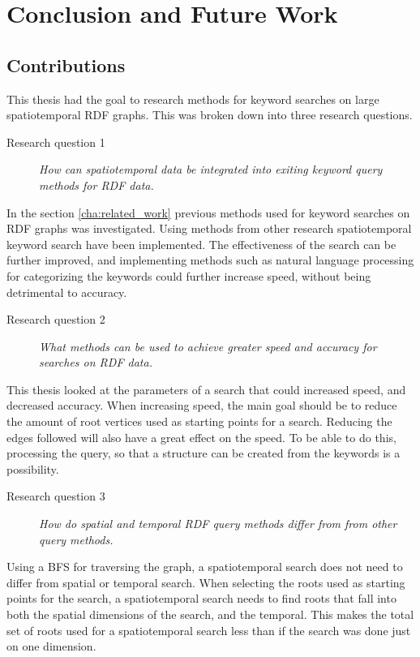 \chapter{Conclusion and Future Work}
\label{cha:Conclusion}

\section{Contributions}
\label{sec:Contributions}
This thesis had the goal to research methods for keyword searches on large spatiotemporal RDF graphs. This was broken down into three research questions.

\begin{description}
    \item[Research question 1] {\em How can spatiotemporal data be integrated into exiting keyword query methods for RDF data.}
\end{description}
In the section \ref{cha:related_work} previous methods used for keyword searches on RDF graphs was investigated. Using methods from other research spatiotemporal keyword search have been implemented. The effectiveness of the search can be further improved, and implementing methods such as natural language processing for categorizing the keywords could further increase speed, without being detrimental to accuracy.

\begin{description}
    \item[Research question 2] {\em What methods can be used to achieve greater speed and accuracy for searches on RDF data.}
\end{description}
This thesis looked at the parameters of a search that could increased speed, and decreased accuracy. When increasing speed, the main goal should be to reduce the amount of root vertices used as starting points for a search. Reducing the edges followed will also have a great effect on the speed. To be able to do this, processing the query, so that a structure can be created from the keywords is a possibility.

\begin{description}
    \item[Research question 3] {\em How do spatial and temporal RDF query methods differ from from other query methods.}
\end{description}
Using a BFS for traversing the graph, a spatiotemporal search does not need to differ from spatial or temporal search. When selecting the roots used as starting points for the search, a spatiotemporal search needs to find roots that fall into both the spatial dimensions of the search, and the temporal. This makes the total set of roots used for a spatiotemporal search less than if the search was done just on one dimension.

